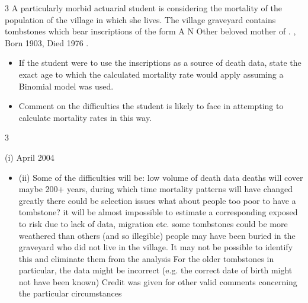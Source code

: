 \documentclass[a4paper,12pt]{article}
\begin{document}
3
A particularly morbid actuarial student is considering the mortality of the population
of the village in which she lives. The village graveyard contains tombstones which
bear inscriptions of the form A N Other beloved mother of . , Born 1903,
Died 1976 .
\begin{itemize}
\item  If the student were to use the inscriptions as a source of death data, state the
exact age to which the calculated mortality rate would apply assuming a
Binomial model was used.

\item  Comment on the difficulties the student is likely to face in attempting to
calculate mortality rates in this way.
\end{itemize}
3

(i)
April 2004
\begin{itemize}
The death data will be classified as age = calendar year of death calendar
year of birth. This is the same as age at the birthday in the calendar year of
death.
This is a calendar year rate interval, and the range of exact ages for a life
labelled x at the start of the rate interval is ( x 1, x).
So the average age at the start of the rate interval is x 0.5 and
because we are using a binomial model, this is the age to which the calculated
rate would apply.
\item (ii)
Some of the difficulties will be:
low volume of death data
deaths will cover maybe 200+ years, during which time mortality
patterns will have changed greatly
there could be selection issues
what about people too poor to have a
tombstone?
it will be almost impossible to estimate a corresponding exposed to
risk
due to lack of data, migration etc.
some tombstones could be more weathered than others (and so
illegible)
people may have been buried in the graveyard who did not live in the
village. It may not be possible to identify this and eliminate them from
the analysis
For the older tombstones in particular, the data might be incorrect (e.g.
the correct date of birth might not have been known)
Credit was given for other valid comments concerning the particular
circumstances
\end{itemize}
\end{document}
